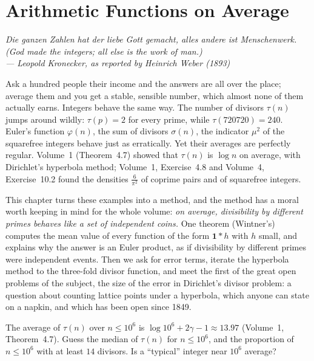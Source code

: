 \chapter{Arithmetic Functions on Average}

\begin{center}\itshape
Die ganzen Zahlen hat der liebe Gott gemacht, alles andere ist Menschenwerk.\\
(God made the integers; all else is the work of man.)\\
\upshape --- Leopold Kronecker, as reported by Heinrich Weber (1893)
\end{center}

Ask a hundred people their income and the answers are all over the place; average them and you get a stable, sensible number,
which almost none of them actually earns. Integers behave the same way. The number of divisors $\tau(n)$ jumps around wildly: $\tau(p)=2$ for every prime, while $\tau(720720)=240$. Euler's function
$\varphi(n)$, the sum of divisors $\sigma(n)$, the indicator $\mu^2$ of the squarefree integers behave just as erratically. Yet
their averages are perfectly regular. Volume~1 (Theorem~4.7) showed that $\tau(n)$ is $\log n$ on average, with Dirichlet's hyperbola
method; Volume~1, Exercise~4.8 and Volume~4, Exercise~10.2 found the densities $\frac6{\pi^2}$ of coprime pairs and of squarefree
integers.

This chapter turns these examples into a method, and the method has a moral worth keeping in mind for the whole volume: \emph{on average,
divisibility by different primes behaves like a set of independent coins.} One theorem (Wintner's) computes the mean value of every function of
the form $\mathbf1*h$ with $h$ small, and explains why the answer is an Euler product, as if divisibility by different primes were
independent events. Then we ask for error terms, iterate the hyperbola method to the three-fold divisor function, and meet the
first of the great open problems of the subject, the size of the error in Dirichlet's divisor problem: a question about counting
lattice points under a hyperbola, which anyone can state on a napkin, and which has been open since 1849.

\begin{think}
The average of $\tau(n)$ over $n\le10^6$ is $\log10^6+2\gamma-1\approx13.97$ (Volume~1, Theorem~4.7). Guess the median of $\tau(n)$ for
$n\le10^6$, and the proportion of $n\le10^6$ with at least $14$ divisors. Is a ``typical'' integer near $10^6$ average?
\end{think}

